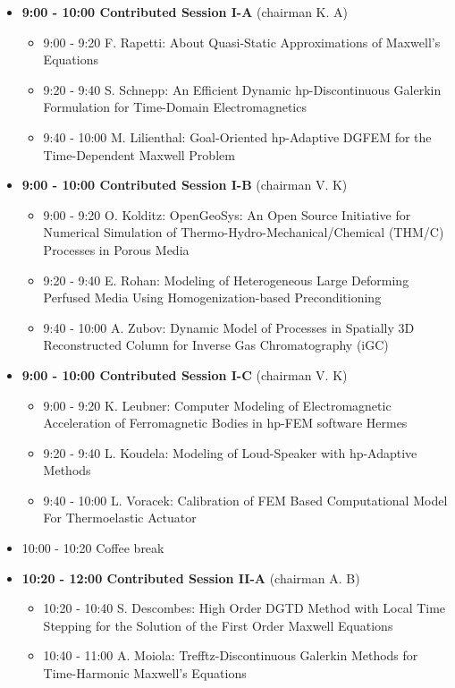 \documentclass[10pt, A4]{article}%
\begin{document}
\begin{itemize}    
  \item {\bf 9:00 - 10:00 Contributed Session I-A} (chairman K. A) 
  \begin{itemize}
    \item 9:00 - 9:20 F. Rapetti: About Quasi-Static Approximations of Maxwell’s Equations
    \item 9:20 - 9:40 S. Schnepp: An Efficient Dynamic hp-Discontinuous Galerkin Formulation for Time-Domain Electromagnetics
    \item 9:40 - 10:00 M. Lilienthal: Goal-Oriented hp-Adaptive DGFEM for the Time-Dependent Maxwell Problem
  \end{itemize}
  \item {\bf 9:00 - 10:00 Contributed Session I-B} (chairman V. K) 
  \begin{itemize}
    \item 9:00 - 9:20 O. Kolditz: OpenGeoSys: An Open Source Initiative for Numerical Simulation of Thermo-Hydro-Mechanical/Chemical (THM/C) Processes in Porous Media
    \item 9:20 - 9:40 E. Rohan: Modeling of Heterogeneous Large Deforming Perfused Media Using Homogenization-based Preconditioning
    \item 9:40 - 10:00 A. Zubov: Dynamic Model of Processes in Spatially 3D Reconstructed Column for Inverse Gas Chromatography (iGC)
  \end{itemize}
    \item {\bf 9:00 - 10:00 Contributed Session I-C} (chairman V. K) 
  \begin{itemize}
    \item 9:00 - 9:20 K. Leubner: Computer Modeling of Electromagnetic Acceleration of Ferromagnetic Bodies in hp-FEM software Hermes
    \item 9:20 - 9:40 L. Koudela: Modeling of Loud-Speaker with hp-Adaptive Methods
    \item 9:40 - 10:00 L. Voracek: Calibration of FEM Based Computational Model For Thermoelastic Actuator
  \end{itemize}
  \item 10:00 - 10:20 Coffee break
  \item {\bf 10:20 - 12:00 Contributed Session II-A} (chairman A. B) 
  \begin{itemize}
    \item 10:20 - 10:40 S. Descombes: High Order DGTD Method with Local Time Stepping for the Solution of the First Order Maxwell Equations
    \item 10:40 - 11:00 A. Moiola: Trefftz-Discontinuous Galerkin Methods for Time-Harmonic Maxwell’s Equations

\end{itemize}
\end{itemize}
\end{document}
